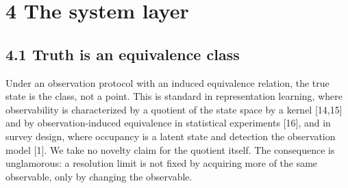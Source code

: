 \documentclass[11pt,a4paper]{article}
\theoremstyle{definition}
\theoremstyle{remark}
\begin{document}
\section*{4  The system layer}
\subsection*{4.1  Truth is an equivalence class}
Under an observation protocol with an induced equivalence relation, the true state is the class, not a point. This is standard in representation learning, where observability is characterized by a quotient of the state space by a kernel [14,15] and by observation-induced equivalence in statistical experiments [16], and in survey design, where occupancy is a latent state and detection the observation model [1]. We take no novelty claim for the quotient itself. The consequence is unglamorous: a resolution limit is not fixed by acquiring more of the same observable, only by changing the observable.
\end{document}
